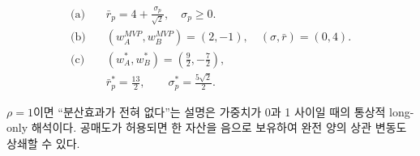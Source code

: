 \begin{answerbox}
\begin{align*}
\text{(a)}\quad &\bar r_p=4+\frac{\sigma_p}{\sqrt2},\quad\sigma_p\ge0.\\
\text{(b)}\quad &(w_A^{MVP},w_B^{MVP})=(2,-1),\quad(\sigma,\bar r)=(0,4).\\
\text{(c)}\quad &(w_A^*,w_B^*)=\left(\frac92,-\frac72\right),\\
&\bar r_p^*=\frac{13}{2},\qquad\sigma_p^*=\frac{5\sqrt2}{2}.
\end{align*}
\end{answerbox}

\begin{warningbox}
$\rho=1$이면 ``분산효과가 전혀 없다''는 설명은 가중치가 $0$과 1 사이일 때의 통상적 long-only 해석이다. 공매도가 허용되면 한 자산을 음으로 보유하여 완전 양의 상관 변동도 상쇄할 수 있다.
\end{warningbox}
